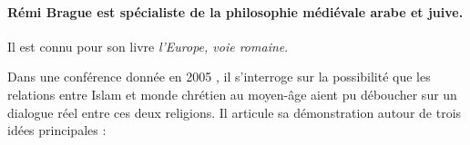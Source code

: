 
\begin{comment}

\paragraph{Instruction} 5000 signes, très synthétique. Fiche de lecture, idées principales du texte (plan haché : donc on peut rassembler les idées qui vient d'une conférence). Qui est Rémi Brague ? Quelle publication ? Arriver à la fois à faire des liens avec une séance de théologie ou d'histoire ?  En particulier lire Convivencia. Texte d'un chrétien. Deuxième partie est libre et on se permet sur 1/3 des signes, comment on a lu le texte "pas assez approfondi",... Se relire et éviter les fautes. 


Cette fiche de lecture, entre 4000 et 5000 caractères (espace compris), devra :  

- présenter brièvement  l'auteur de l'article

- mettre en évidence les idées fortes du texte dans un contexte d'intérêt croissant des chercheurs pour les relations entre musulmans et non-musulmans (cf. gros programme de recherche dirigé par John Tolan évoqué aujourd'hui)

- Votre conclusion, dense, vous permettra de faire un commentaire personnel sur les apports et limites de l'article, en le situant par rapport à la réflexion plus large que nous menons en cours et que vous entreprenez, de votre côté, par vos lectures personnelles
\end{comment}



\paragraph{Rémi Brague est spécialiste de la philosophie médiévale arabe et juive.} Il  est connu pour son livre  \textit{l'Europe, voie romaine}\cite{brague_europe_2009}. 

 
Dans une conférence donnée en 2005 \cite{lejbowicz_y_2005}, il s'interroge sur la possibilité que les relations entre Islam et monde chrétien au moyen-âge aient pu déboucher sur un dialogue réel entre ces deux religions. 
Il articule sa démonstration autour de trois idées principales : \begin{comment}
    : l'asymétrie entre monde Islamique et monde Chrétien, l'absence de tolérance religieuse au Moyen-âge, et le caractère largement polémique des \textit{dialogues} entre religions
\end{comment}



